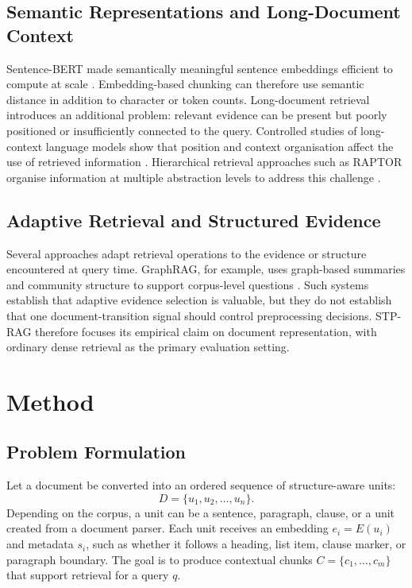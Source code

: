 \documentclass[conference]{IEEEtran}
\begin{document}
\subsection{Semantic Representations and Long-Document Context}
Sentence-BERT made semantically meaningful sentence embeddings efficient to compute at scale \parencite{reimers2019sentence}. Embedding-based chunking can therefore use semantic distance in addition to character or token counts. Long-document retrieval introduces an additional problem: relevant evidence can be present but poorly positioned or insufficiently connected to the query. Controlled studies of long-context language models show that position and context organisation affect the use of retrieved information \parencite{liu2024lost}. Hierarchical retrieval approaches such as RAPTOR organise information at multiple abstraction levels to address this challenge \parencite{sarthi2024raptor}.

\subsection{Adaptive Retrieval and Structured Evidence}
Several approaches adapt retrieval operations to the evidence or structure encountered at query time. GraphRAG, for example, uses graph-based summaries and community structure to support corpus-level questions \parencite{edge2024local}. Such systems establish that adaptive evidence selection is valuable, but they do not establish that one document-transition signal should control preprocessing decisions. STP-RAG therefore focuses its empirical claim on document representation, with ordinary dense retrieval as the primary evaluation setting.

\section{Method}
\subsection{Problem Formulation}
Let a document be converted into an ordered sequence of structure-aware units:
\begin{equation}
D=\{u_1,u_2,\ldots,u_n\}.
\end{equation}
Depending on the corpus, a unit can be a sentence, paragraph, clause, or a unit created from a document parser. Each unit receives an embedding $e_i=E(u_i)$ and metadata $s_i$, such as whether it follows a heading, list item, clause marker, or paragraph boundary. The goal is to produce contextual chunks $C=\{c_1,\ldots,c_m\}$ that support retrieval for a query $q$.
\end{document}
